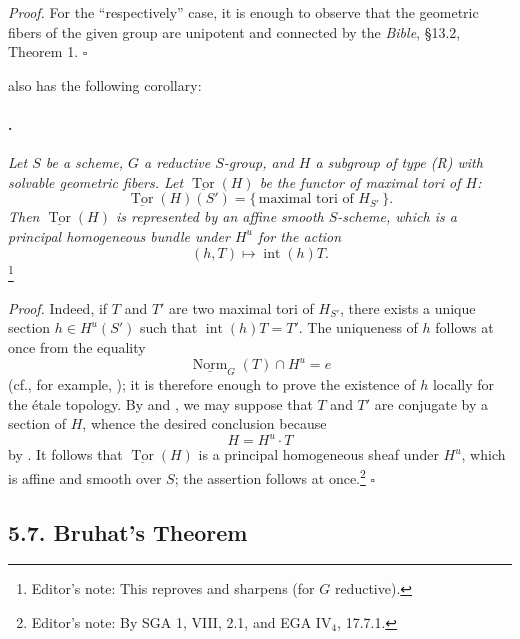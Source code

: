 \textit{Proof.}
For the ``respectively'' case, it is enough to observe that the
geometric fibers of the given group are unipotent and connected by
the \emph{Bible}, \S13.2, Theorem 1\textup{}.
\hfill\(\square\)

 also has the following corollary:

\paragraph{.}
\textit{Let \(S\) be a scheme, \(G\) a reductive \(S\)-group, and
\(H\) a subgroup of type \textup{(R)} with solvable geometric
fibers. Let \(\underline{\operatorname{Tor}}(H)\) be the functor of
maximal tori of \(H\):}
\[
  \underline{\operatorname{Tor}}(H)(S')
  =
  \{\,\text{maximal tori of }H_{S'}\,\}.
\]
\textit{Then \(\underline{\operatorname{Tor}}(H)\) is represented by
an affine smooth \(S\)-scheme, which is a principal homogeneous
bundle under \(H^u\) for the action}
\[
  (h,T)\longmapsto\operatorname{int}(h)T.
\]
\footnote{Editor's note: This reproves and sharpens 
\textup{(for \(G\) reductive)}.}

\textit{Proof.}
Indeed, if \(T\) and \(T'\) are two maximal tori of \(H_{S'}\), there
exists a unique section \(h\in H^u(S')\) such that
\(\operatorname{int}(h)T=T'\). The uniqueness of \(h\) follows at
once from the equality
\[
  \underline{\operatorname{Norm}}_G(T)\cap H^u=e
\]
\textup{(cf., for example, )}; it is therefore enough to prove
the existence of \(h\) locally for the étale topology. By  and
\textup{}, we may suppose that \(T\) and \(T'\) are conjugate
by a section of \(H\), whence the desired conclusion because
\[
  H=H^u\cdot T
\]
by \textup{}. It follows that
\(\underline{\operatorname{Tor}}(H)\) is a principal homogeneous
sheaf under \(H^u\), which is affine and smooth over \(S\); the
assertion follows at once.\footnote{Editor's note: By SGA 1, VIII,
2.1, and EGA \(\mathrm{IV}_4\), 17.7.1.}
\hfill\(\square\)

\subsection*{5.7. Bruhat's Theorem}

